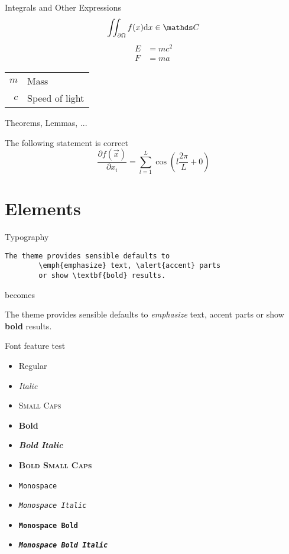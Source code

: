\begin{frame}{Integrals and Other Expressions}
	\begin{equation}
		\iint_{\partial\Omega}f(x)\diff{x} \in \complexes
	\end{equation}
	\begin{align}
		E &= mc^2\\
		F &= ma
	\end{align}

	\seprule
	
	\begin{tabular}{rl}
		$m$ & Mass\\
		$c$ & Speed of light
	\end{tabular}
\end{frame}
\begin{frame}{Theorems, Lemmas, ...}
	\begin{thm}
		The following statement is correct
		\begin{equation}
			\frac{\partial f(\vec{x})}{\partial x_i} = \sum_{l=1}^{L}\cos\left(l\frac{2\pi}{L} + 0\right)
		\end{equation}
	\end{thm}
\end{frame}

\section{Elements}

\begin{frame}[fragile]{Typography}
	\begin{verbatim}The theme provides sensible defaults to
		\emph{emphasize} text, \alert{accent} parts
		or show \textbf{bold} results.\end{verbatim}
	
	\begin{center}becomes\end{center}
	
	The theme provides sensible defaults to \emph{emphasize} text,
	\alert{accent} parts or show \textbf{bold} results.
\end{frame}

\begin{frame}{Font feature test}
	\begin{itemize}
		\item Regular
		\item \textit{Italic}
		\item \textsc{Small Caps}
		\item \textbf{Bold}
		\item \textbf{\textit{Bold Italic}}
		\item \textbf{\textsc{Bold Small Caps}}
		\item \texttt{Monospace}
		\item \texttt{\textit{Monospace Italic}}
		\item \texttt{\textbf{Monospace Bold}}
		\item \texttt{\textbf{\textit{Monospace Bold Italic}}}
	\end{itemize}
\end{frame}

